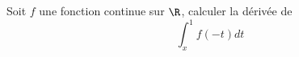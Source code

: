 Soit $f$ une fonction continue sur $\R$, calculer la d{\'e}riv{\'e}e de \[\int_x ^1 f(-t) dt\]
\bigskip